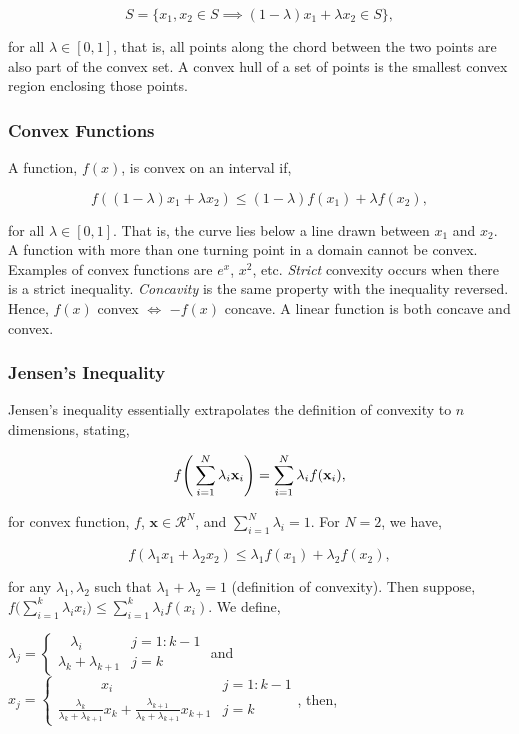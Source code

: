 \documentclass[11pt]{amsart}
\begin{document}
$$S = \Big\{x_1, x_2 \in S \implies (1 - \lambda) x_1 + \lambda x_2 \in S \Big\},$$

for all $\lambda \in [0, 1]$, that is, all points along the chord between the two points are also part of the convex set. A convex hull of a set of points is the smallest convex region enclosing those points.

\subsubsection{Convex Functions}
A function, $f(x)$, is convex on an interval if,

$$
f((1 - \lambda)x_1 + \lambda x_2) \leq (1 - \lambda) f(x_1) + \lambda f(x_2),
$$

for all $\lambda \in [0, 1]$. That is, the curve lies below a line drawn between $x_1$ and $x_2$. A function with more than one turning point in a domain cannot be convex. Examples of convex functions are $e^x$, $x^2$, etc. \emph{Strict} convexity occurs when there is a strict inequality. \emph{Concavity} is the same property with the inequality reversed. Hence, $f(x)$ convex $\Longleftrightarrow$ $-f(x)$ concave. A linear function is both concave and convex.

\subsubsection{Jensen's Inequality}

Jensen's inequality essentially extrapolates the definition of convexity to $n$ dimensions, stating,

$$
f\Bigg(\sum_{i=1}^{N}\lambda_i \mathbf{x}_i\Bigg) = \sum_{i=1}^{N} \lambda_if(\mathbf{x}_i) \notag,
$$

for convex function, $f$, $\mathbf{x} \in \mathcal{R}^N$, and $\sum_{i=1}^N \lambda_i = 1$. For $N = 2$, we have,

$$
f(\lambda_1 x_1 + \lambda_2 x_2) \leq \lambda_1f(x_1) + \lambda_2f(x_2),
$$

for any $\lambda_1, \lambda_2$ such that $\lambda_1 + \lambda_2 = 1$ (definition of convexity). Then suppose, $f\big(\sum_{i=1}^k\lambda_i x_i\big) \leq \sum_{i=1}^k \lambda_if(x_i).$ We define,

$
\lambda_j = \begin{cases}
\ \ \ \ \lambda_i & j = 1: k-1 \\
\lambda_k + \lambda_{k+1} & j = k
\end{cases} $ and $
x_j = \begin{cases} 
\ \ \ \ \ \ \ \ \ \ \ \ \ \  x_i & j = 1: k-1 \\
\frac{\lambda_k}{\lambda_k + \lambda_{k+1}}x_k + \frac{\lambda_{k+1}}{\lambda_k + \lambda_{k+1}}x_{k+1} & j = k
\end{cases}$, then,
\end{document}
